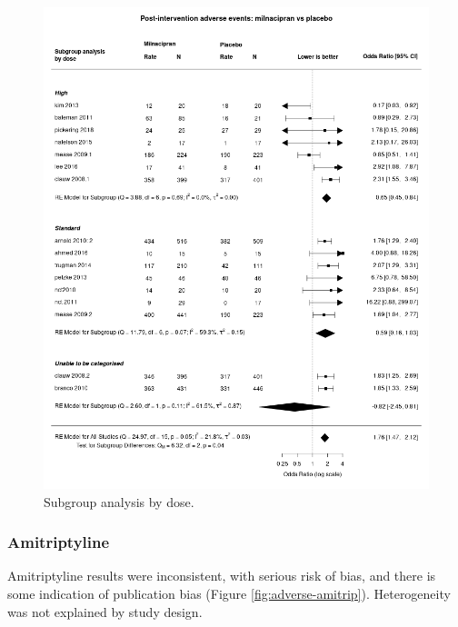 \documentclass{report}\usepackage[]{graphicx}\usepackage[]{color}
\begin{document}
\begin{figure}

\includegraphics[width=\textwidth]{img/adverse-dose-milnacipran-placebo-forest.png}
\caption[adverse by dose: milnacipran]{
Subgroup analysis by dose. 
}
\label{fig:adverse-dose-milna-plac}
\end{figure}

\subsubsection{Amitriptyline}

Amitriptyline results were inconsistent, with serious risk of bias, and there is some indication of publication bias (Figure \ref{fig:adverse-amitrip}). Heterogeneity was not explained by study design.
\end{document}
